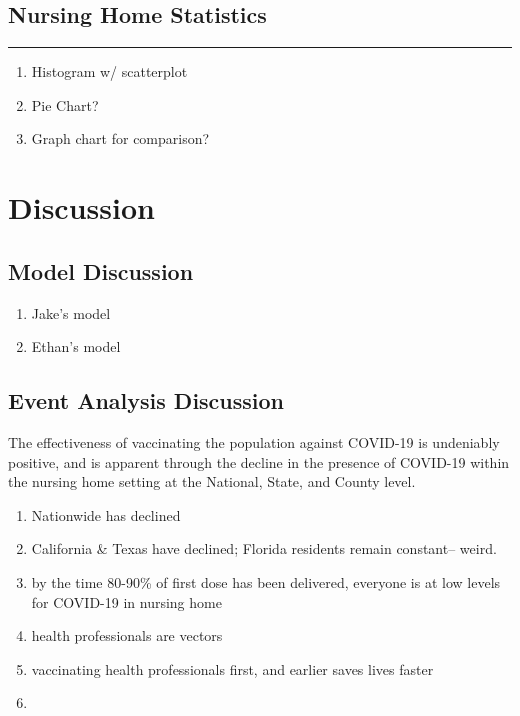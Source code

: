 \documentclass[twoside]{article}
\begin{document}
\begin{multicols}{2}
\subsection{Nursing Home Statistics}
\rule{\linewidth}{0.25pt}

\begin{enumerate}
	\item Histogram w/ scatterplot 
	\item Pie Chart?
	\item Graph chart for comparison?
\end{enumerate}


\section{Discussion}

\subsection{Model Discussion}

\begin{enumerate}
	\item Jake's model
	\item Ethan's model
\end{enumerate}


\subsection{Event Analysis Discussion}

The effectiveness of vaccinating the population against COVID-19 is undeniably positive, and is apparent through the decline in the presence of COVID-19 within the nursing home setting at the National, State, and County level. 

\vspace{5mm}

\begin{enumerate}
	\item Nationwide has declined
	\item California \& Texas have declined; Florida residents remain constant-- weird.
	\item by the time 80-90\% of first dose has been delivered, everyone is at low levels for COVID-19 in nursing home
	\item health professionals are vectors
	\item vaccinating health professionals first, and earlier saves lives faster
	\item 
	

\end{enumerate}
\end{multicols}
\end{document}
